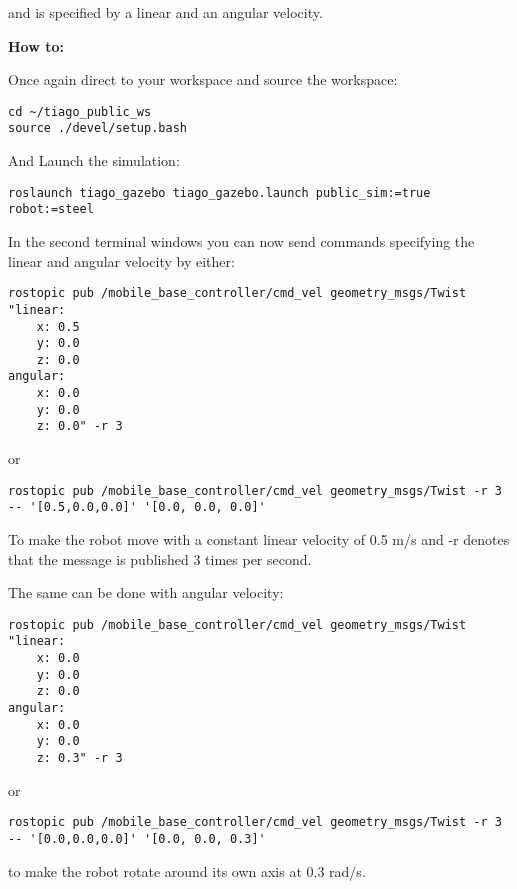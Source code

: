 and is specified by a linear and an angular velocity.

\textbf{How to:}

Once again direct to your workspace and source the workspace:

\begin{verbatim}
cd ~/tiago_public_ws
source ./devel/setup.bash
\end{verbatim}

And Launch the simulation:

\begin{verbatim}
roslaunch tiago_gazebo tiago_gazebo.launch public_sim:=true robot:=steel
\end{verbatim}

In the second terminal windows you can now send commands specifying the linear and angular velocity by either:

\begin{verbatim}
rostopic pub /mobile_base_controller/cmd_vel geometry_msgs/Twist "linear:
	x: 0.5
	y: 0.0
	z: 0.0
angular:
	x: 0.0
	y: 0.0
	z: 0.0" -r 3
\end{verbatim}

or

\begin{verbatim}
rostopic pub /mobile_base_controller/cmd_vel geometry_msgs/Twist -r 3 -- '[0.5,0.0,0.0]' '[0.0, 0.0, 0.0]'
\end{verbatim}

To make the robot move with a constant linear velocity of 0.5 m/s and -r denotes that the message is published 3 times per second.

The same can be done with angular velocity:

\begin{verbatim}
rostopic pub /mobile_base_controller/cmd_vel geometry_msgs/Twist "linear:
	x: 0.0
	y: 0.0
	z: 0.0
angular:
	x: 0.0
	y: 0.0
	z: 0.3" -r 3
\end{verbatim}

or 

\begin{verbatim}
rostopic pub /mobile_base_controller/cmd_vel geometry_msgs/Twist -r 3 -- '[0.0,0.0,0.0]' '[0.0, 0.0, 0.3]'
\end{verbatim}

to make the robot rotate around its own axis at 0.3 rad/s.

%
% 



\iffalse
\begin{verbatim}
\end{verbatim}
\fi